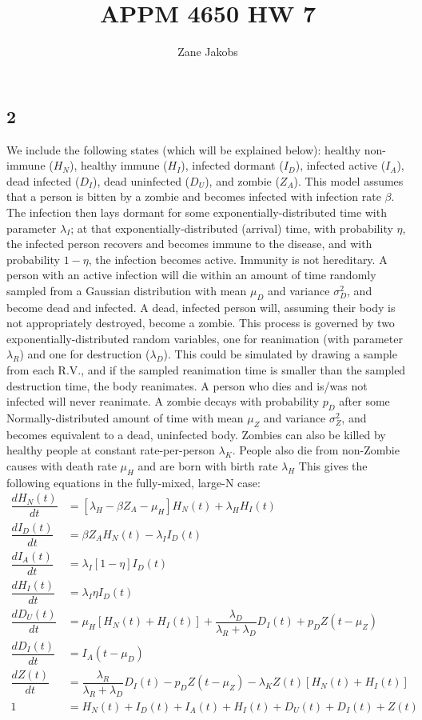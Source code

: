 \documentclass[]{article}
\title{APPM 4650 HW 7}
\author{Zane Jakobs}
\begin{document}
	\maketitle
	
	
	\subsection*{2}
	We include the following states (which will be explained below): healthy non-immune ($H_N$), healthy immune ($H_I$), infected dormant ($I_D$), infected active ($I_A$), dead infected ($D_I$), dead uninfected ($D_U$), and zombie ($Z_A$). This model assumes that a person is bitten by a zombie and becomes infected with infection rate $\beta$. The infection then lays dormant for some exponentially-distributed time with parameter $\lambda_I$; at that exponentially-distributed (arrival) time, with probability $\eta$, the infected person recovers and becomes immune to the disease, and with probability $1-\eta$, the infection becomes active. Immunity is not hereditary. A person with an active infection will die within an amount of time randomly sampled from a Gaussian distribution with mean $\mu_D$ and variance $\sigma^2_D$, and become dead and infected. A dead, infected person will, assuming their body is not appropriately destroyed, become a zombie. This process is governed by two exponentially-distributed random variables, one for reanimation (with parameter $\lambda_R$) and one for destruction ($\lambda_D$). This could be simulated by drawing a sample from each R.V., and if the sampled reanimation time is smaller than the sampled destruction time, the body reanimates. A person who dies and is/was not infected will never reanimate. A zombie decays with probability $p_D$ after some Normally-distributed amount of time with mean $\mu_Z$ and variance $\sigma^2_Z$, and becomes equivalent to a dead, uninfected body. Zombies can also be killed by healthy people at constant rate-per-person $\lambda_K$. People also die from non-Zombie causes with death rate $\mu_H$ and are born with birth rate $\lambda_H$ This gives the following equations in the fully-mixed, large-N case:
	\[
	\begin{aligned}
	\dfrac{d H_N(t)}{dt} &= [\lambda_H  - \beta Z_A - \mu_H] H_N(t) + \lambda_H H_I(t)\\
	\dfrac{d I_D(t)}{dt} &= \beta Z_A H_N(t) - \lambda_I I_D(t)\\
	\dfrac{d I_A(t)}{dt} &= \lambda_I [1-\eta] I_D(t)\\
	\dfrac{d H_I(t)}{dt} &= \lambda_I \eta I_D(t)\\
	\dfrac{d D_U(t)}{dt} &= \mu_H [H_N(t) + H_I(t)] + \dfrac{\lambda_D}{\lambda_R + \lambda_D} D_I(t) + p_D Z(t-\mu_Z)\\
	\dfrac{d D_I(t)}{dt} &= I_A(t-\mu_D)\\
	\dfrac{d Z(t)}{dt} &= \dfrac{\lambda_R}{\lambda_R + \lambda_D} D_I(t) - p_D Z(t-\mu_Z) - \lambda_K Z(t)[H_N(t) + H_I(t)]\\ 
	1 &= H_N(t) + I_D(t) + I_A(t) + H_I(t) + D_U(t) + D_I(t) + Z(t) 
	\end{aligned}
	\]
	
\end{document}
